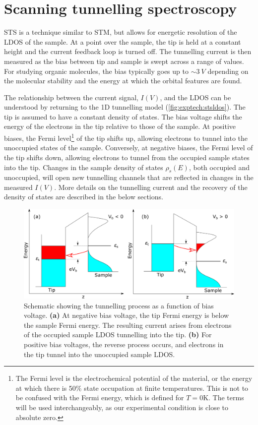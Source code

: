 \section{Scanning tunnelling spectroscopy}
\label{sec:exptech:sts}

\Acf{STS} is a technique similar to \ac{STM}, but allows for energetic resolution of the \ac{LDOS} of the sample. At a point over the sample, the tip is held at a constant height and the current feedback loop is turned off. The tunnelling current is then measured as the bias between tip and sample is swept across a range of values. For studying organic molecules, the bias typically goes up to $\sim \SI{3}{V}$ depending on the molecular stability and the energy at which the orbital features are found.

The relationship between the current signal, $I(V)$, and the \ac{LDOS} can be understood by returning to the \ac{1D} tunnelling model (\autoref{fig:exptech:stsldos}). The tip is assumed to have a constant density of states. The bias voltage shifts the energy of the electrons in the tip relative to those of the sample. At positive biases, the Fermi level\footnote{The Fermi level is the electrochemical potential of the material, or the energy at which there is 50\% state occupation at finite temperatures. This is not to be confused with the Fermi energy, which is defined for $T=0$K. The terms will be used interchangeably, as our experimental condition is close to absolute zero.} of the tip shifts up, allowing electrons to tunnel into the unoccupied states of the sample. Conversely, at negative biases, the Fermi level of the tip shifts down, allowing electrons to tunnel from the occupied sample states into the tip. Changes in the sample density of states $\rho_s(E)$, both occupied and unoccupied, will open new tunnelling channels that are reflected in changes in the measured $I(V)$. More details on the tunnelling current and the recovery of the density of states are described in the below sections.

\begin{figure} [h]
    \centering
    \includegraphics[width=\textwidth]{pictures/sts_ldos.png}
    \caption{Schematic showing the tunnelling process as a function of bias voltage. \textbf{(a)} At negative bias voltage, the tip Fermi energy is below the sample Fermi energy. The resulting current arises from electrons of the occupied sample LDOS tunnelling into the tip. \textbf{(b)} For positive bias voltages, the reverse process occurs, and electrons in the tip tunnel into the unoccupied sample LDOS.}
    \label{fig:exptech:stsldos}
\end{figure}

